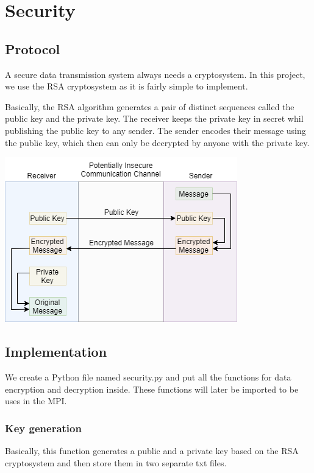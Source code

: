 \section{Security}

\subsection{Protocol}

A secure data transmission system always needs a cryptosystem. In this project, we use the RSA cryptosystem \cite{rsa} as it is fairly simple to implement.

Basically, the RSA algorithm generates a pair of distinct sequences called the public key and the private key. The receiver keeps the private key in secret whil publishing the public key to any sender. The sender encodes their message using the public key, which then can only be decrypted by anyone with the private key.

\begin{center}
    \includegraphics[]{images/rsa.png}
\end{center}

\subsection{Implementation}
We create a Python file named security.py and put all the functions for data encryption and decryption inside. These functions will later be imported to be uses in the MPI. 

\subsubsection{Key generation}

Basically, this function generates a public and a private key based on the RSA cryptosystem and then store them in two separate txt files.

